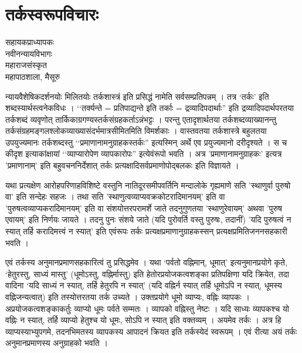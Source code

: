 \chapter{तर्कस्वरूपविचारः}

\begin{center}
\smallskip

सहायकप्राध्यापकः\\
नवीनन्यायविभागः\\
महाराजसंस्कृत\\
महापाठशाला, मैसूरु
\addrule
\end{center}
न्यायवैशेषिकदर्शनयोः मिलितयोः तर्कशास्त्रं इति प्रसिद्धं नामेति सर्वसम्प्रतिपन्नम् । तत्र ‘तर्कः' इति शब्दस्यार्थस्त्वनेकविधः । ‘‘तर्क्यन्ते = प्रतिपाद्यन्ते इति तर्काः = द्रव्यादिपदार्थाः'' इति द्रव्यादिपदार्थपरतया तर्कशब्दं व्यवृणोत् तार्किकाग्रगण्यस्तर्कसंग्रहकर्ताऽन्नंभट्टः । परन्तु एतादृशार्थतया तर्कशब्दव्याख्यानन्तु तर्कसंग्रहमङ्गलश्लोकव्याख्यासंदर्भमात्रसीमितमिति विमर्शकाः । वास्तवतया तर्कशास्त्रे बहुलतया उपयुज्यमानः तर्कशब्दस्तु ‘‘प्रमाणानामनुग्राहकस्तर्कः'' इत्यस्मिन् अर्थे एव प्रयुज्यमानो दरीदृश्यते । स च कीदृश इत्याकांक्षायां ‘‘व्याप्यारोपेण व्यापकारोपः'' इत्येवंरूपो भवति । अत्र 'प्रमाणानामनुग्राहकः' इत्यत्र 'प्रमाणानाम्' इति बहुवचननिर्देशात् तर्कः प्रत्यक्षादिसर्वप्रमाणोपोद्बलकः इति विज्ञायते । 

यथा प्रत्यक्षेण आरोहपरिणाहविशिष्टे वस्तुनि नातिदूरसमीपवर्तिनि मन्दालोके गृह्यमाणे सति 'स्थाणुर्वा पुरुषो वा' इति सन्देहः सहजः । तथा सति 'स्थाणुत्वव्याप्यवक्रकोटरादिमानयम्' इति वा 'पुरुषत्वव्याप्यकरादिमानयम्' इति वा संशयोत्तरपरामर्शे जाते तदनुगुणतया 'स्थाणुरेवायम्' अथवा 'पुरुष एवायम्' इति निर्णयः जायते । तदनु पुनः संशये जाते (यदि पुरोवर्ति वस्तु पुरुषः, तदानीं) 'यदि पुरुषत्वं न स्यात् तर्हि करादिमत्त्वं न स्यात्' इति एवंरूपः तर्कः प्रत्यक्षप्रमाणानुग्राहकस्सन् प्रत्यक्षप्रमितिजननसहकारी भवति । 

एवं तर्कस्य अनुमानप्रमाणसहकारित्वं तु प्रसिद्धमेव । यथा ‘पर्वतो वह्निमान्, धूमात्' इत्यनुमानप्रयोगे कृते, ‘हेतुरस्तु, साध्यं मास्तु' (धूमोऽस्तु, वह्निर्मास्तु) इति हेतोरप्रयोजकत्वशङ्का प्रतिपक्षिणा यदि क्रियेत, तदा वादिना ‘यदि साध्यं न स्यात्, तर्हि हेतुरपि न स्यात्' (यदि वह्निर्न स्यात् तर्हि धूमोऽपि न स्यात्, धूमस्य वह्निजन्यत्वात्) इति तस्योत्तरतया तर्क उच्यते । उक्तप्रयोगे धूमो व्याप्यः, वह्निः व्यापकः । अप्रयोजकत्वशङ्काकर्तुः व्याप्यो धूमः पर्वते सम्मतः । व्यापको वह्निस्तु नेष्टः । यदि साध्यः व्यापकश्च यो वह्निः न स्यात्, तर्हि व्याप्यो हेतुश्च यो धूमः, सोऽपि न स्यात् इति वक्तव्यम् । अयमेव तर्कः । अत्र हि व्याप्यस्याभ्युपगमे, तदनभिमतस्य व्यापकस्य आपादनं क्रियत इति तर्कस्येदं स्वरूपम् । एवं रीत्या अयं तर्कः अनुमानप्रमाणस्य अनुग्राहको भवति । 

